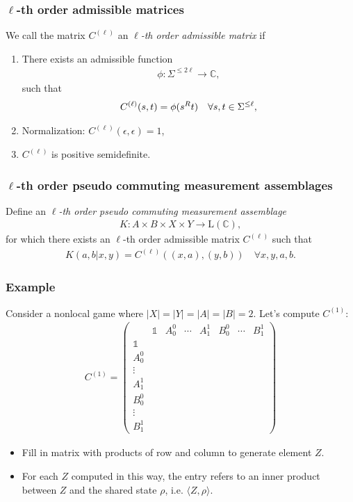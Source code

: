 \documentclass{beamer}
\def\I{\mathds{1}}
\newcommand{\abs}[1]{\lvert #1 \rvert}
\newcommand{\ip}[2]{\langle #1 , #2\rangle}
\def\complex{\mathbb{C}}
\newcommand{\setft}[1]{\mathrm{#1}}
\newcommand{\Lin}{\setft{L}}
\begin{document}
\begin{frame}
	\frametitle{$\ell$-th order admissible matrices}
	We call the matrix $C^{(\ell)}$ an \emph{$\ell$-th order admissible matrix} if 
	\begin{enumerate}
		\item There exists an admissible function 
			\begin{align*}
				\phi : \Sigma^{\leq 2 \ell} \rightarrow \complex,
			\end{align*}
			such that 
			\begin{align*}
				C^{(\ell)}(s,t) = \phi(s^{\tiny{R}}t) \quad \forall s,t \in \Sigma^{\leq \ell},
			\end{align*}
		\item Normalization: $C^{(\ell)}(\epsilon,\epsilon) = 1$,
		\item $C^{(\ell)}$ is positive semidefinite. 
	\end{enumerate}
\end{frame}

\begin{frame}
	\frametitle{$\ell$-th order pseudo commuting measurement assemblages}
	Define an \emph{$\ell$-th order pseudo commuting measurement assemblage} 
	\begin{align*}
		K: A \times B \times X \times Y \rightarrow \Lin(\complex),
	\end{align*}
	for which there exists an $\ell$-th order admissible matrix $C^{(\ell)}$ such that 
	\begin{align*}
		K(a,b|x,y) = C^{(\ell)}((x,a),(y,b)) \quad \forall x,y,a,b. 
	\end{align*}
\end{frame}

\begin{frame}
	\frametitle{Example}
	Consider a nonlocal game where $\abs{X} = \abs{Y} = \abs{A} = \abs{B} = 2$. Let's compute $C^{(1)}$:
	\[
\begin{aligned}
C^{(1)} =
\left(
\begin{array}{c||cccc|ccc}
 & \I & A_0^0 & \cdots & A_1^1 & B_0^0 & \cdots & B_1^1 \\
\hline\hline 
\I & & & & & & & \\
A_0^0 & & & & & & &  \\
\vdots & & & & & & & \\
A_1^1 & & & & & & & \\
\hline 
B_0^0 & & & & & & & \\
\vdots & & & & & & & \\
B_1^1 & & & & & & & 
\end{array}
\right) 
\end{aligned}
\]

\begin{itemize}
	\item Fill in matrix with products of row and column to generate element $Z$. 
	\item For each $Z$ computed in this way, the entry refers to an inner product between $Z$ and the shared state $\rho$, i.e. $\ip{Z}{\rho}$. 
\end{itemize}

\end{frame}
\end{document}

